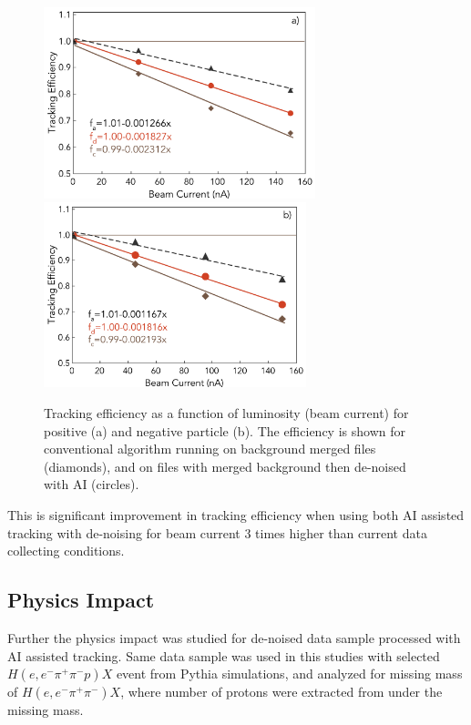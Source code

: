 \begin{figure}[!h]
\begin{center}
 \includegraphics[width=3.1in]{images/figure_lscan_pos_ai.pdf}
 \includegraphics[width=3in]{images/figure_lscan_neg_ai.pdf}
\caption {Tracking efficiency as a function of luminosity (beam current) for positive (a) and negative particle (b).  The efficiency is shown for
conventional algorithm running on background merged files (diamonds), and on files with merged background then de-noised with AI (circles).}
 \label{lscan::conv_dn_ai}
 \end{center}
\end{figure}

This is significant improvement in tracking efficiency when using both AI assisted tracking with de-noising for beam current 3 times higher than current data collecting conditions. 

\subsection{Physics Impact}

Further the physics impact was studied for de-noised data sample processed with AI assisted tracking. Same data 
sample was used in this studies with selected $H(e,e^-\pi^+\pi^-p)X$ event from Pythia simulations, and analyzed for
missing mass of $H(e,e^-\pi^+\pi^-)X$, where number of protons were extracted from under the missing mass. 


